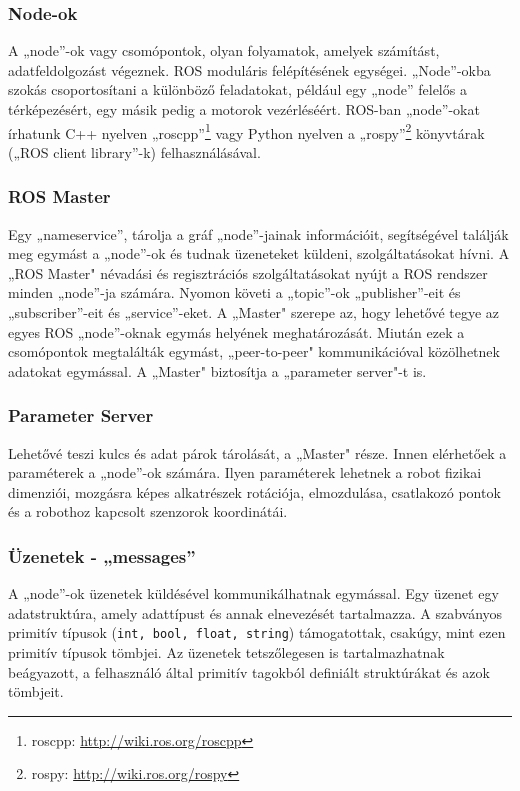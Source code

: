 \subsubsection{Node-ok}
A „node”-ok vagy csomópontok, olyan folyamatok, amelyek számítást, adatfeldolgozást végeznek. ROS moduláris felépítésének egységei. „Node”-okba szokás csoportosítani a különböző feladatokat, például egy „node” felelős a térképezésért, egy másik pedig a motorok vezérléséért. ROS-ban „node”-okat írhatunk C++ nyelven „roscpp”\footnote{roscpp: \url{http://wiki.ros.org/roscpp}} vagy Python nyelven a „rospy”\footnote{rospy: \url{http://wiki.ros.org/rospy}} könyvtárak („ROS client library”-k) felhasználásával.

\subsubsection{ROS Master}
Egy „nameservice”, tárolja a gráf „node”-jainak információit, segítségével találják meg egymást a „node”-ok és tudnak üzeneteket küldeni, szolgáltatásokat hívni. A „ROS Master" névadási és regisztrációs szolgáltatásokat nyújt a ROS rendszer minden „node”-ja számára. Nyomon követi a „topic”-ok „publisher”-eit és „subscriber”-eit és „service”-eket. A „Master" szerepe az, hogy lehetővé tegye az egyes ROS „node”-oknak egymás helyének meghatározását. Miután ezek a csomópontok megtalálták egymást, „peer-to-peer" kommunikációval közölhetnek adatokat egymással. A „Master" biztosítja a „parameter server"-t is.

\subsubsection{Parameter Server}
Lehetővé teszi kulcs és adat párok tárolását, a „Master" része. Innen elérhetőek a paraméterek a „node”-ok számára. Ilyen paraméterek lehetnek a robot fizikai dimenziói, mozgásra képes alkatrészek rotációja, elmozdulása, csatlakozó pontok és a robothoz kapcsolt szenzorok koordinátái.

\subsubsection{Üzenetek - „messages”}
A „node”-ok üzenetek küldésével kommunikálhatnak egymással. Egy üzenet egy adatstruktúra, amely adattípust és annak elnevezését tartalmazza. A szabványos primitív típusok (\verb|int, bool, float, string|) támogatottak, csakúgy, mint ezen primitív típusok tömbjei. Az üzenetek tetszőlegesen is tartalmazhatnak beágyazott, a felhasználó által primitív tagokból definiált struktúrákat és azok tömbjeit.

